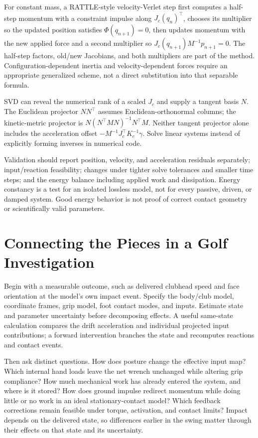 For constant mass, a RATTLE-style velocity-Verlet step first computes a half-step momentum with a constraint impulse along $J_c(q_n)^\top$, chooses its multiplier so the updated position satisfies $\Phi(q_{n+1})=0$, then updates momentum with the new applied force and a second multiplier so $J_c(q_{n+1})M^{-1}p_{n+1}=0$. The half-step factors, old/new Jacobians, and both multipliers are part of the method. Configuration-dependent inertia and velocity-dependent forces require an appropriate generalized scheme, not a direct substitution into that separable formula.

SVD can reveal the numerical rank of a scaled $J_c$ and supply a tangent basis $N$. The Euclidean projector $NN^\top$ assumes Euclidean-orthonormal columns; the kinetic-metric projector is $N(N^\top MN)^{-1}N^\top M$. Neither tangent projector alone includes the acceleration offset $-M^{-1}J_c^\top K_c^{-1}\gamma$. Solve linear systems instead of explicitly forming inverses in numerical code.

Validation should report position, velocity, and acceleration residuals separately; input/reaction feasibility; changes under tighter solve tolerances and smaller time steps; and the energy balance including applied work and dissipation. Energy constancy is a test for an isolated lossless model, not for every passive, driven, or damped system. Good energy behavior is not proof of correct contact geometry or scientifically valid parameters.

\section{Connecting the Pieces in a Golf Investigation}
\label{sec:ch9:integration}

Begin with a measurable outcome, such as delivered clubhead speed and face orientation at the model's own impact event. Specify the body/club model, coordinate frames, grip model, foot contact modes, and inputs. Estimate state and parameter uncertainty before decomposing effects. A useful same-state calculation compares the drift acceleration and individual projected input contributions; a forward intervention branches the state and recomputes reactions and contact events.

Then ask distinct questions. How does posture change the effective input map? Which internal hand loads leave the net wrench unchanged while altering grip compliance? How much mechanical work has already entered the system, and where is it stored? How does ground impulse redirect momentum while doing little or no work in an ideal stationary-contact model? Which feedback corrections remain feasible under torque, activation, and contact limits? Impact depends on the delivered state, so differences earlier in the swing matter through their effects on that state and its uncertainty.

